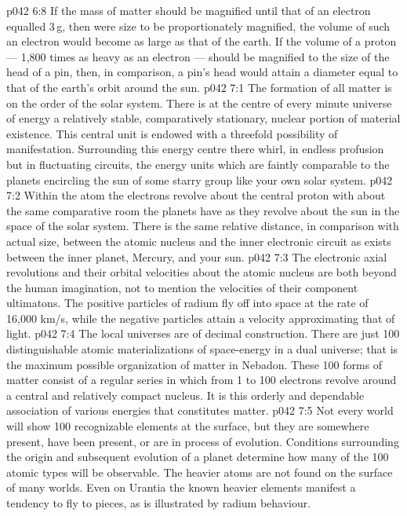 \vs p042 6:8 \pc If the mass of matter should be magnified until that of an electron equalled 3\,g, then were size to be proportionately magnified, the volume of such an electron would become as large as that of the earth. If the volume of a proton --- 1,800 times as heavy as an electron --- should be magnified to the size of the head of a pin, then, in comparison, a pin’s head would attain a diameter equal to that of the earth’s orbit around the sun.
\vs p042 7:1 The formation of all matter is on the order of the solar system. There is at the centre of every minute universe of energy a relatively stable, comparatively stationary, nuclear portion of material existence. This central unit is endowed with a threefold possibility of manifestation. Surrounding this energy centre there whirl, in endless profusion but in fluctuating circuits, the energy units which are faintly comparable to the planets encircling the sun of some starry group like your own solar system.
\vs p042 7:2 \pc Within the atom the electrons revolve about the central proton with about the same comparative room the planets have as they revolve about the sun in the space of the solar system. There is the same relative distance, in comparison with actual size, between the atomic nucleus and the inner electronic circuit as exists between the inner planet, Mercury, and your sun.
\vs p042 7:3 The electronic axial revolutions and their orbital velocities about the atomic nucleus are both beyond the human imagination, not to mention the velocities of their component ultimatons. The positive particles of radium fly off into space at the rate of 16,000 km/s, while the negative particles attain a velocity approximating that of light.
\vs p042 7:4 \pc The local universes are of decimal construction. There are just 100 distinguishable atomic materializations of space\hyp{}energy in a dual universe; that is the maximum possible organization of matter in Nebadon. These 100 forms of matter consist of a regular series in which from 1 to 100 electrons revolve around a central and relatively compact nucleus. It is this orderly and dependable association of various energies that constitutes matter.
\vs p042 7:5 Not every world will show 100 recognizable elements at the surface, but they are somewhere present, have been present, or are in process of evolution. Conditions surrounding the origin and subsequent evolution of a planet determine how many of the 100 atomic types will be observable. The heavier atoms are not found on the surface of many worlds. Even on Urantia the known heavier elements manifest a tendency to fly to pieces, as is illustrated by radium behaviour.
